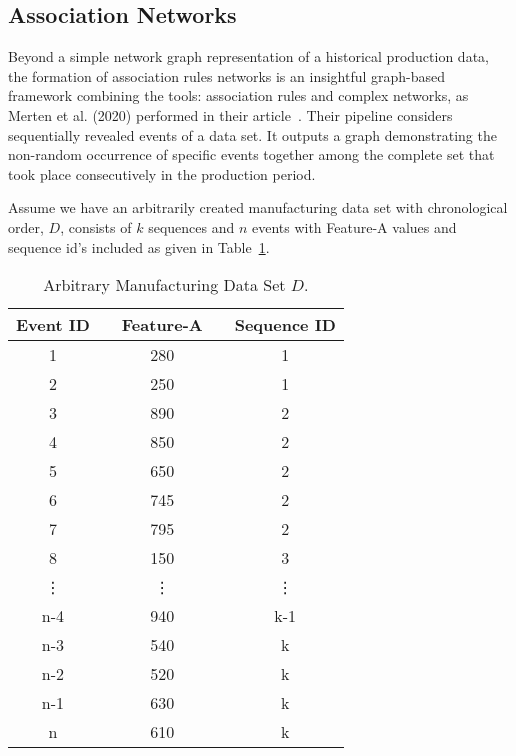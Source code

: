 \subsection{Association Networks}
Beyond a simple network graph representation of a historical production data, the formation of association rules networks is an insightful graph-based framework combining the tools: association rules and complex networks, as Merten et al. (2020) performed in their article~\cite{MERTEN2020}. Their pipeline considers sequentially revealed events of a data set. It outputs a graph demonstrating the non-random occurrence of specific events together among the complete set that took place consecutively in the production period.

Assume we have an arbitrarily created manufacturing data set with chronological order, $D$, consists of $k$ sequences and $n$ events with Feature-A values and sequence id's included as given in Table~\ref{Tab:D-dataset}.
\renewcommand{\arraystretch}{1.1}
\begin{table}[ht!]
	\centering
	\setlength{\arrayrulewidth}{0.79pt}%
	\caption{Arbitrary Manufacturing Data Set $D$.}
	\begin{tabular}{|c|ccc|c|}
		\hline \rowcolor[HTML]{FFFFC7}
		Event ID && Feature-A && Sequence ID   \\ \hline
		1 	      && 280  	&& 1 		   	  \\
		2 		  && 250	&& 1 		   	  \\
		3 	      && 890	&& 2 		      \\
		4 		  && 850	&& 2 		      \\
		5 	      && 650	&& 2   		      \\
		6 	      && 745	&& 2 		      \\
		7 		  && 795	&& 2 		      \\
		8 		  && 150	&& 3 		      \\
		\vdots	  && \vdots && \vdots 	      \\
		n-4 	  && 940  	&& k-1	 	      \\
		n-3 	  && 540  	&& k			  \\
		n-2 	  && 520	&& k 		      \\
		n-1       && 630	&& k 		      \\
		n 		  && 610	&& k 		      \\ \hline
	\end{tabular}
	\label{Tab:D-dataset}
\end{table}

